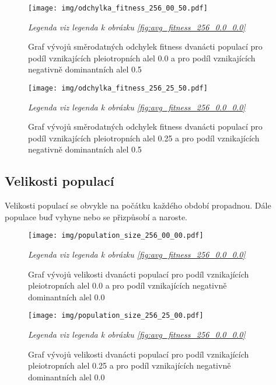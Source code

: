 \begin{figure}[H]
\caption{Graf vývojů směrodatných odchylek fitness dvanácti populací pro podíl vznikajících pleiotropních alel 0.0 a pro podíl
    vznikajících negativně dominantních alel 0.5}
\centering
\texttt{[image: img/odchylka\_fitness\_256\_00\_50.pdf]}

\label{fig:odchylka_fitness_256_0.0_0.5}

\textit{Legenda viz legenda k obrázku \ref{fig:avg_fitness_256_0.0_0.0}}

\end{figure}

\begin{figure}[H]
\caption{Graf vývojů směrodatných odchylek fitness dvanácti populací pro podíl vznikajících pleiotropních alel 0.25 a pro podíl
    vznikajících negativně dominantních alel 0.5}
\centering
\texttt{[image: img/odchylka\_fitness\_256\_25\_50.pdf]}

\label{fig:odchylka_fitness_256_0.25_0.5}

\textit{Legenda viz legenda k obrázku \ref{fig:avg_fitness_256_0.0_0.0}}

\end{figure}


\subsection{Velikosti populací}

Velikosti populací se obvykle na počátku každého období propadnou. Dále populace buď vyhyne nebo se přizpůsobí a naroste.

\begin{figure}[H]
\caption{Graf vývojů velikosti dvanácti populací pro podíl vznikajících pleiotropních alel 0.0 a pro podíl
         vznikajících negativně dominantních alel 0.0}
\centering
\texttt{[image: img/population\_size\_256\_00\_00.pdf]}

\label{fig:population_size_256_0.0_0.0}

\textit{Legenda viz legenda k obrázku \ref{fig:avg_fitness_256_0.0_0.0}}

\end{figure}


\begin{figure}[H]
\caption{Graf vývojů velikosti dvanácti populací pro podíl vznikajících pleiotropních alel 0.25 a pro podíl
        vznikajících negativně dominantních alel 0.0}
\centering
\texttt{[image: img/population\_size\_256\_25\_00.pdf]}

\label{fig:population_size_256_0.25_0.0}

\textit{Legenda viz legenda k obrázku \ref{fig:avg_fitness_256_0.0_0.0}}

\end{figure}

